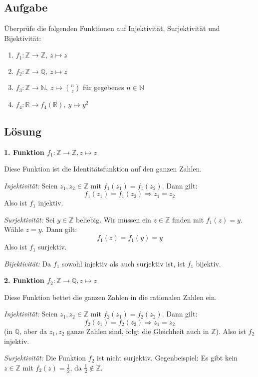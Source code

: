 \documentclass{article}
\begin{document}
\subsection*{Aufgabe}
Überprüfe die folgenden Funktionen auf Injektivität, Surjektivität und
Bijektivität:
\begin{enumerate}
\item $f_{1} \colon \mathbb{Z} \to \mathbb{Z}, \: z \mapsto z$
\item $f_{2} \colon \mathbb{Z} \to \mathbb{Q}, \: z \mapsto z$
\item $f_{3}\colon \mathbb{Z} \to \mathbb{N}, \: z \mapsto \binom{n}{z}$ für gegebenes
  $n \in \mathbb{N}$
\item $f_{4}\colon \mathbb{R} \to f_{4}(\mathbb{R}), \: y \mapsto y^{2}$
\end{enumerate}

\subsection*{Lösung}

\textbf{1. Funktion $f_1: \mathbb{Z} \to \mathbb{Z}, z \mapsto z$}

Diese Funktion ist die Identitätsfunktion auf den ganzen Zahlen.

\textit{Injektivität:} Seien $z_1, z_2 \in \mathbb{Z}$ mit $f_1(z_1) = f_1(z_2)$. Dann gilt:
$$f_1(z_1) = f_1(z_2) \Rightarrow z_1 = z_2$$
Also ist $f_1$ injektiv.

\textit{Surjektivität:} Sei $y \in \mathbb{Z}$ beliebig. Wir müssen ein $z \in \mathbb{Z}$ finden mit $f_1(z) = y$. 
Wähle $z = y$. Dann gilt:
$$f_1(z) = f_1(y) = y$$
Also ist $f_1$ surjektiv.

\textit{Bijektivität:} Da $f_1$ sowohl injektiv als auch surjektiv ist, ist $f_1$ bijektiv.

\textbf{2. Funktion $f_2: \mathbb{Z} \to \mathbb{Q}, z \mapsto z$}

Diese Funktion bettet die ganzen Zahlen in die rationalen Zahlen ein.

\textit{Injektivität:} Seien $z_1, z_2 \in \mathbb{Z}$ mit $f_2(z_1) = f_2(z_2)$. Dann gilt:
$$f_2(z_1) = f_2(z_2) \Rightarrow z_1 = z_2$$
(in $\mathbb{Q}$, aber da $z_1, z_2$ ganze Zahlen sind, folgt die Gleichheit auch in $\mathbb{Z}$).
Also ist $f_2$ injektiv.

\textit{Surjektivität:} Die Funktion $f_2$ ist nicht surjektiv. 
Gegenbeispiel: Es gibt kein $z \in \mathbb{Z}$ mit $f_2(z) = \frac{1}{2}$, da $\frac{1}{2} \notin \mathbb{Z}$.
\end{document}
